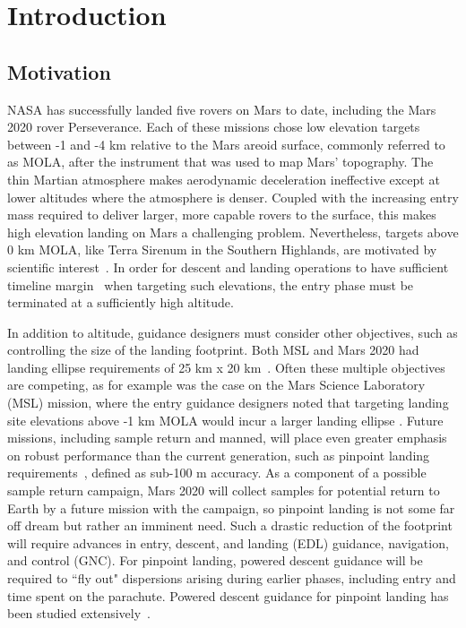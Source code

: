 \chapter{Introduction}
%
%
\section{Motivation}
NASA has successfully landed five rovers on Mars to date, including the Mars 2020 rover Perseverance. Each of these missions chose low elevation targets between -1 and -4 km relative to the Mars areoid surface, commonly referred to as MOLA, after the instrument that was used to map Mars' topography. 
The thin Martian atmosphere makes aerodynamic deceleration ineffective except at lower altitudes where the atmosphere is denser. Coupled with the increasing entry mass required to deliver larger, more capable rovers to the surface, this makes high elevation landing on Mars a challenging problem. Nevertheless, targets above 0 km MOLA, like Terra Sirenum in the Southern Highlands, are motivated by scientific interest~\cite{MarsWater}. In order for descent and landing operations to have sufficient timeline margin~\cite{BraunMarsEDL,MSL_EDL2} when targeting such elevations, the entry phase must be terminated at a sufficiently high altitude.

In addition to altitude, guidance designers must consider other objectives, such as controlling the size of the landing footprint. Both MSL and Mars 2020 had landing ellipse requirements of 25 km x 20 km~\cite{MSL_EDL2,M2020_EDL}. Often these multiple objectives are competing, as for example was the case on the Mars Science Laboratory (MSL) mission, where the entry guidance designers noted that targeting landing site elevations above -1 km MOLA would incur a larger landing ellipse \cite{MSL_EDL2}. 
Future missions, including sample return \cite{MSR} and manned, will place even greater emphasis on robust performance than the current generation, such as pinpoint landing requirements~\cite{PinpointWolf,EvolvableMars}, defined as sub-100 m accuracy. As a component of a possible sample return campaign, Mars 2020 will collect samples for potential return to Earth by a future mission with the campaign, so pinpoint landing is not some far off dream but rather an imminent need. Such a drastic reduction of the footprint will require advances in entry, descent, and landing (EDL) guidance, navigation, and control (GNC). For pinpoint landing, powered descent guidance will be required to ``fly out" dispersions arising during earlier phases, including entry and time spent on the parachute. Powered descent guidance for pinpoint landing has been studied extensively~\cite{PoweredDescentBehcet,PoweredDescentUCI,GFOLDTest,SRP_ControllableSets,PinpointLandingProspects}. 

